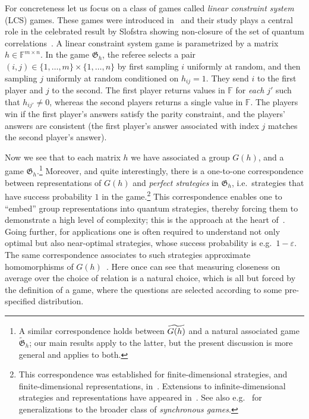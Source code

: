 \documentclass[11pt]{article}
\theoremstyle{definition}
\newcommand{\F}{\ensuremath{\mathbb{F}}}
\newcommand{\eps}{\varepsilon}
\newcommand{\game}{\mathfrak{G}}
\begin{document}
For concreteness let us focus on a class of games called \emph{linear constraint system} (LCS) games. These games were introduced in~\cite{cleve2014characterization} and their study plays a central role in the celebrated result by Slofstra showing non-closure of the set of quantum correlations~\cite{slofstra2019set}. A linear constraint system game is parametrized by a matrix $h\in \F^{m\times n}$. In the game $\game_h$, the referee selects a pair $(i,j)\in \{1,\ldots,m\}\times\{1,\ldots,n\}$ by first sampling $i$ uniformly at random, and then sampling $j$ uniformly at random conditioned on $h_{ij}=1$. They send $i$ to the first player and $j$ to the second. The first player returns values in $\F$ for \emph{each} $j'$ such that $h_{ij'}\neq 0$, whereas the second players returns a single value in $\F$. The players win if the first player's answers satisfy the parity constraint, and the players' answers are consistent (the first player's answer associated with index $j$ matches the second player's answer). 

Now we see that to each matrix $h$ we have associated a group $G(h)$, and a game $\game_h$.\footnote{A similar correspondence holds between $\widetilde{G(h)}$ and a natural associated game $\widetilde{\game}_h$; our main results apply to the latter, but the present discussion is more general and applies to both.} Moreover, and quite interestingly, there is a one-to-one correspondence between representations of $G(h)$ and \emph{perfect strategies} in $\game_h$, i.e.\ strategies that have success probability $1$ in the game.\footnote{This correspondence was established for finite-dimensional strategies, and finite-dimensional representations, in~\cite{cleve2014characterization}. Extensions to infinite-dimensional strategies and representations have appeared in~\cite{cleve2017perfect}. See also e.g.~\cite{kim2018synchronous} for generalizations to the broader class of \emph{synchronous games}.}
This correspondence enables one to ``embed'' group representations into quantum strategies, thereby forcing them to demonstrate a high level of complexity; this is the approach at the heart of~\cite{slofstra2019set}. Going further, for applications one is often required to understand not only optimal but also near-optimal strategies, whose success probability is e.g.\ $1-\eps$. The same correspondence associates to such strategies approximate homomorphisms of $G(h)$~\cite{slofstra2018entanglement}. Here once can see that measuring closeness on average over the choice of relation is a natural choice, which is all but forced by the definition of a game, where the questions are selected according to some pre-specified distribution. 
\end{document}
